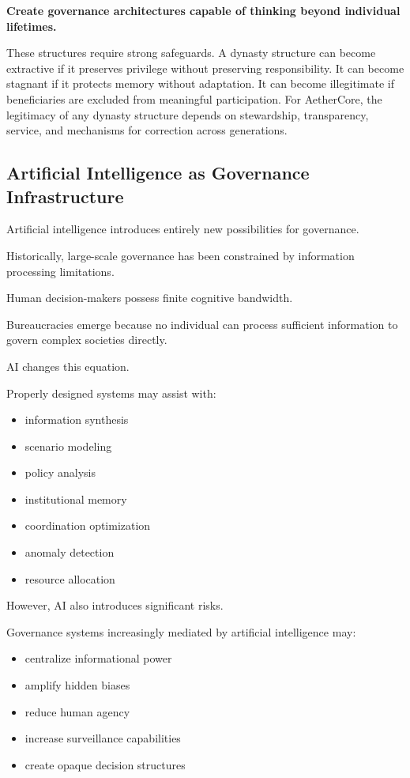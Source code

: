 \documentclass[12pt]{article}
\begin{document}
\begin{center}
\textbf{Create governance architectures capable of thinking beyond individual lifetimes.}
\end{center}

These structures require strong safeguards. A dynasty structure can become extractive if it preserves privilege without preserving responsibility. It can become stagnant if it protects memory without adaptation. It can become illegitimate if beneficiaries are excluded from meaningful participation. For AetherCore, the legitimacy of any dynasty structure depends on stewardship, transparency, service, and mechanisms for correction across generations.

\subsection{Artificial Intelligence as Governance Infrastructure}

Artificial intelligence introduces entirely new possibilities for governance.

Historically, large-scale governance has been constrained by information processing limitations.

Human decision-makers possess finite cognitive bandwidth.

Bureaucracies emerge because no individual can process sufficient information to govern complex societies directly.

AI changes this equation.

Properly designed systems may assist with:

\begin{itemize}
  \item information synthesis
  \item scenario modeling
  \item policy analysis
  \item institutional memory
  \item coordination optimization
  \item anomaly detection
  \item resource allocation
\end{itemize}

However, AI also introduces significant risks.

Governance systems increasingly mediated by artificial intelligence may:

\begin{itemize}
  \item centralize informational power
  \item amplify hidden biases
  \item reduce human agency
  \item increase surveillance capabilities
  \item create opaque decision structures
\end{itemize}
\end{document}
